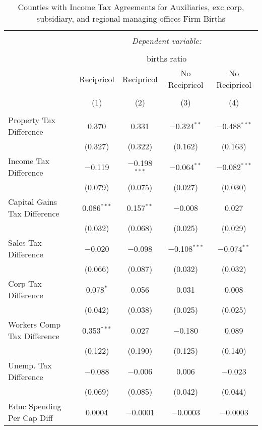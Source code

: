 
\begin{table}[!htbp] \centering 
  \caption{Counties with Income Tax Agreements for  Auxiliaries, exc corp, subsidiary, and regional managing offices Firm Births} 
  \label{95rd} 
\begin{tabular}{@{\extracolsep{5pt}}lcccc} 
\\[-1.8ex]\hline 
\hline \\[-1.8ex] 
 & \multicolumn{4}{c}{\textit{Dependent variable:}} \\ 
\cline{2-5} 
\\[-1.8ex] & \multicolumn{4}{c}{births ratio} \\ 
 & Recipricol & Recipricol & No Recipricol & No Recipricol \\ 
\\[-1.8ex] & (1) & (2) & (3) & (4)\\ 
\hline \\[-1.8ex] 
 Property Tax Difference & 0.370 & 0.331 & $-$0.324$^{**}$ & $-$0.488$^{***}$ \\ 
  & (0.327) & (0.322) & (0.162) & (0.163) \\ 
  Income Tax Difference & $-$0.119 & $-$0.198$^{***}$ & $-$0.064$^{**}$ & $-$0.082$^{***}$ \\ 
  & (0.079) & (0.075) & (0.027) & (0.030) \\ 
  Capital Gains Tax Difference & 0.086$^{***}$ & 0.157$^{**}$ & $-$0.008 & 0.027 \\ 
  & (0.032) & (0.068) & (0.025) & (0.029) \\ 
  Sales Tax Difference & $-$0.020 & $-$0.098 & $-$0.108$^{***}$ & $-$0.074$^{**}$ \\ 
  & (0.066) & (0.087) & (0.032) & (0.032) \\ 
  Corp Tax Difference & 0.078$^{*}$ & 0.056 & 0.031 & 0.008 \\ 
  & (0.042) & (0.038) & (0.025) & (0.025) \\ 
  Workers Comp Tax Difference & 0.353$^{***}$ & 0.027 & $-$0.180 & 0.089 \\ 
  & (0.122) & (0.190) & (0.125) & (0.140) \\ 
  Unemp. Tax Difference & $-$0.088 & $-$0.006 & 0.006 & $-$0.023 \\ 
  & (0.069) & (0.085) & (0.042) & (0.044) \\ 
  Educ Spending Per Cap Diff & 0.0004 & $-$0.0001 & $-$0.0003 & $-$0.0003 \\ 

\end{tabular}
\end{table}
